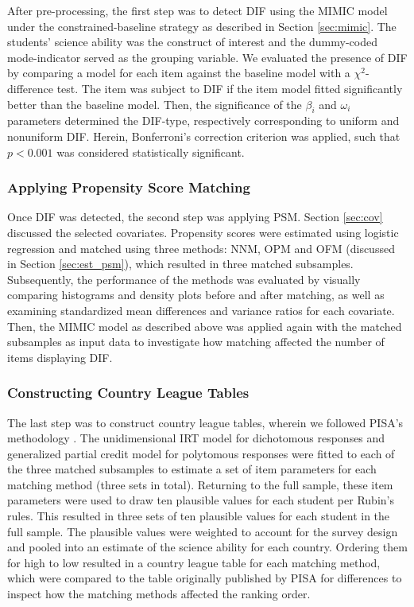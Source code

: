 \documentclass{article}
\begin{document}
After pre-processing, the first step was to detect DIF using the MIMIC model under the constrained-baseline strategy as described in Section \ref{sec:mimic}. The students' science ability was the construct of interest and the dummy-coded mode-indicator served as the grouping variable. We evaluated the presence of DIF by comparing a model for each item against the baseline model with a $\chi^2$-difference test. The item was subject to DIF if the item model fitted significantly better than the baseline model. Then, the significance of the $\beta_i$ and $\omega_i$ parameters determined the DIF-type, respectively corresponding to uniform and nonuniform DIF. Herein, Bonferroni's correction criterion was applied, such that $p < 0.001$ was considered statistically significant.

\subsubsection{Applying Propensity Score Matching}

Once DIF was detected, the second step was applying PSM. Section \ref{sec:cov} discussed the selected covariates. Propensity scores were estimated using logistic regression and matched using three methods: NNM, OPM and OFM (discussed in Section \ref{sec:est_psm}), which resulted in three matched subsamples. Subsequently, the performance of the methods was evaluated by visually comparing histograms and density plots before and after matching, as well as examining standardized mean differences and variance ratios for each covariate. Then, the MIMIC model as described above was applied again with the matched subsamples as input data to investigate how matching affected the number of items displaying DIF.

\subsubsection{Constructing Country League Tables}

The last step was to construct country league tables, wherein we followed PISA's methodology \citep{OECD2018}. The unidimensional IRT model for dichotomous responses and generalized partial credit model for polytomous responses were fitted to each of the three matched subsamples to estimate a set of item parameters for each matching method (three sets in total). Returning to the full sample, these item parameters were used to draw ten plausible values for each student per Rubin's rules. This resulted in three sets of ten plausible values for each student in the full sample. The plausible values were weighted to account for the survey design and pooled into an estimate of the science ability for each country. Ordering them for high to low resulted in a country league table for each matching method, which were compared to the table originally published by PISA for differences to inspect how the matching methods affected the ranking order.
\end{document}
